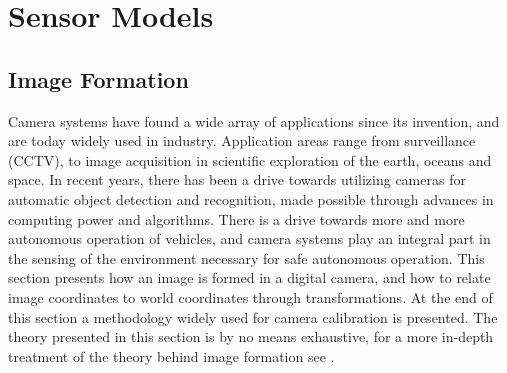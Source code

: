 \graphicspath{{fig/}}
\chapter{Sensor Models}
\section{Image Formation}
Camera systems have found a wide array of applications since its invention, and are today widely used in industry. Application areas range from surveillance (CCTV), to image acquisition in scientific exploration of the earth, oceans and space. In recent years, there has been a drive towards utilizing cameras for automatic object detection and recognition, made possible through advances in computing power and algorithms. There is a drive towards more and more autonomous operation of vehicles, and camera systems play an integral part in the sensing of the environment necessary for safe autonomous operation. This section presents how an image is formed in a digital camera, and how to relate image coordinates to world coordinates through transformations. At the end of this section a methodology widely used for camera calibration is presented. The theory presented in this section is by no means exhaustive, for a more in-depth treatment of the theory behind image formation see \cite{modernCV,CValg,digImage}.
